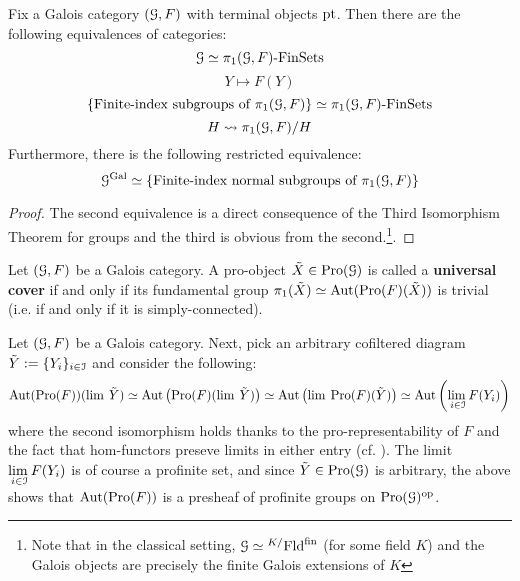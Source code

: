         \begin{proposition} \label{prop: categorical_galois_correspondence}
            Fix a Galois category $(\mathcal{G}, F)$ with terminal objects $\mathrm{pt}$. Then there are the following equivalences of categories:
                $$\mathcal{G} \simeq \pi_1(\mathcal{G}, F)\text{-}\mathrm{Fin}\mathrm{Sets}$$
                $$Y \mapsto F(Y)$$
                $$\{\text{Finite-index subgroups of $\pi_1(\mathcal{G}, F)$}\} \simeq \pi_1(\mathcal{G}, F)\text{-}\mathrm{Fin}\mathrm{Sets}$$
                $$H \leadsto \pi_1(\mathcal{G}, F)/H$$
            Furthermore, there is the following restricted equivalence:
                $$\mathcal{G}^{\mathrm{Gal}} \simeq \{\text{Finite-index normal subgroups of $\pi_1(\mathcal{G}, F)$}\}$$
        \end{proposition}
            \begin{proof}
                
                    
                The second equivalence is a direct consequence of the Third Isomorphism Theorem for groups and the third is obvious from the second.\footnote{Note that in the classical setting, $\mathcal{G} \simeq {}^{K/}\mathrm{Fld}^{\mathrm{fin}}$ (for some field $K$) and the Galois objects are precisely the finite Galois extensions of $K$}.
            \end{proof}
            
        \begin{definition} \label{def: universal_covers}
            Let $(\mathcal{G}, F)$ be a Galois category. A pro-object $\tilde{X} \in \mathrm{Pro}(\mathcal{G})$ is called a \textbf{universal cover} if and only if its fundamental group $\pi_1(\tilde{X}) \simeq \mathrm{Aut}(\mathrm{Pro}(F)(\tilde{X}))$ is trivial (i.e. if and only if it is simply-connected).
        \end{definition}
        \begin{remark} \label{remark: fundamental_groups_are_automorphism_groups_of_universal_covers}
            Let $(\mathcal{G}, F)$ be a Galois category. Next, pick an arbitrary cofiltered diagram $\tilde{Y} := \{Y_i\}_{i \in \mathcal{I}}$ and consider the following:
                $$\mathrm{Aut}(\mathrm{Pro}(F))(\operatorname{lim} \: \tilde{Y}) \simeq \mathrm{Aut}\left(\mathrm{Pro}(F)(\operatorname{lim} \: \tilde{Y})\right) \simeq \mathrm{Aut}\left(\operatorname{lim} \: \mathrm{Pro}(F)(\tilde{Y})\right) \simeq \mathrm{Aut}\left(\underset{i \in \mathcal{I}}{\operatorname{lim} \:} F(Y_i)\right)$$
            where the second isomorphism holds thanks to the pro-representability of $F$ and the fact that hom-functors preseve limits in either entry (cf. \cite{nlab:hom-functor_preserves_limits}). The limit $\underset{i \in \mathcal{I}}{\operatorname{lim} \:} F(Y_i)$ is of course a profinite set, and since $\tilde{Y} \in \mathrm{Pro}(\mathcal{G})$ is arbitrary, the above shows that $\mathrm{Aut}(\mathrm{Pro}(F))$ is a presheaf of profinite groups on $\mathrm{Pro}(\mathcal{G})^{\mathrm{op}}$. 
        \end{remark}
        
